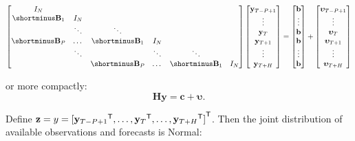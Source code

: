 \documentclass[notitlepage,a4paper,12pt]{article}
\newcommand{\transpose}[1]{{#1}^{\sf{T}}}
\begin{document}
\begin{ThreePartTable}
\begin{equation*}
    \begin{bmatrix}
        I_N \\
        \shortminus\mathbf{B}_1 & I_N \\
        & \ddots & \ddots & \\
        \shortminus\mathbf{B}_{P} & \dots & \shortminus\mathbf{B}_1 & I_N & & \\
        & \ddots &  & \ddots & \ddots & \\
        & & \shortminus\mathbf{B}_{P} & \dots & \shortminus\mathbf{B}_1 & I_N       
    \end{bmatrix}
    \begin{bmatrix}
        \mathbf{y}_{T-P+1} \\
        \vdots \\
        \mathbf{y}_{T} \\
        \mathbf{y}_{T+1} \\
        \vdots \\
        \mathbf{y}_{T+H} 
    \end{bmatrix}
    =
    \begin{bmatrix}
        \mathbf{b} \\
        \vdots \\
        \mathbf{b} \\
        \mathbf{b} \\
        \vdots \\
        \mathbf{b} 
    \end{bmatrix}
    +
    \begin{bmatrix}
        \boldsymbol{\upsilon}_{T-P+1} \\
        \vdots \\
        \boldsymbol{\upsilon}_{T} \\
        \boldsymbol{\upsilon}_{T+1} \\
        \vdots \\
        \boldsymbol{\upsilon}_{T+H} 
    \end{bmatrix}
\end{equation*}

or more compactly:
\begin{equation*}
    \mathbf{H} \mathbf{y} = \mathbf{c} + \boldsymbol{\upsilon}.
\end{equation*}

Define $\mathbf{z}={y} = \transpose{[\transpose{\mathbf{y}_{T-P+1}}, \dots, \transpose{\mathbf{y}_T}, \dots, \transpose{\mathbf{y}_{T+H}}]}$. Then the joint distribution of available observations and forecasts is Normal:


\end{ThreePartTable}
\end{document}
